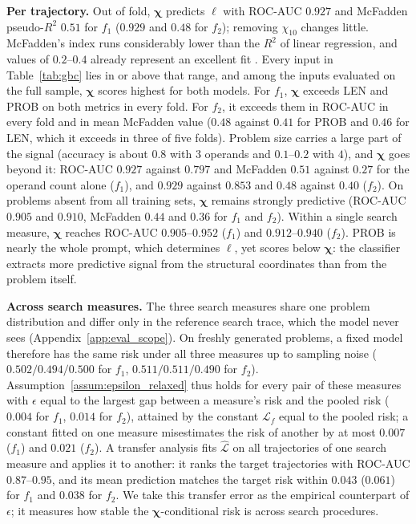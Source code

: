 \textbf{Per trajectory.} Out of fold, $\boldsymbol{\chi}$ predicts $\ell$ with ROC-AUC $0.927$ and McFadden pseudo-$R^2$ $0.51$ for $f_1$ ($0.929$ and $0.48$ for $f_2$); removing $\chi_{10}$ changes little. McFadden's index runs considerably lower than the $R^2$ of linear regression, and values of $0.2$--$0.4$ already represent an excellent fit \citep{mcfadden1979quantitative}. Every input in Table~\ref{tab:gbc} lies in or above that range, and among the inputs evaluated on the full sample, $\boldsymbol{\chi}$ scores highest for both models. For $f_1$, $\boldsymbol{\chi}$ exceeds LEN and PROB on both metrics in every fold. For $f_2$, it exceeds them in ROC-AUC in every fold and in mean McFadden value ($0.48$ against $0.41$ for PROB and $0.46$ for LEN, which it exceeds in three of five folds). Problem size carries a large part of the signal (accuracy is about $0.8$ with $3$ operands and $0.1$--$0.2$ with $4$), and $\boldsymbol{\chi}$ goes beyond it: ROC-AUC $0.927$ against $0.797$ and McFadden $0.51$ against $0.27$ for the operand count alone ($f_1$), and $0.929$ against $0.853$ and $0.48$ against $0.40$ ($f_2$). On problems absent from all training sets, $\boldsymbol{\chi}$ remains strongly predictive (ROC-AUC $0.905$ and $0.910$, McFadden $0.44$ and $0.36$ for $f_1$ and $f_2$). Within a single search measure, $\boldsymbol{\chi}$ reaches ROC-AUC $0.905$--$0.952$ ($f_1$) and $0.912$--$0.940$ ($f_2$). PROB is nearly the whole prompt, which determines $\ell$, yet scores below $\boldsymbol{\chi}$: the classifier extracts more predictive signal from the structural coordinates than from the problem itself.

\textbf{Across search measures.} The three search measures share one problem distribution and differ only in the reference search trace, which the model never sees (Appendix~\ref{app:eval_scope}). On freshly generated problems, a fixed model therefore has the same risk under all three measures up to sampling noise ($0.502/0.494/0.500$ for $f_1$, $0.511/0.511/0.490$ for $f_2$). Assumption~\ref{assum:epsilon_relaxed} thus holds for every pair of these measures with $\epsilon$ equal to the largest gap between a measure's risk and the pooled risk ($0.004$ for $f_1$, $0.014$ for $f_2$), attained by the constant $\mathcal{L}_f$ equal to the pooled risk; a constant fitted on one measure misestimates the risk of another by at most $0.007$ ($f_1$) and $0.021$ ($f_2$). A transfer analysis fits $\hat{\mathcal{L}}$ on all trajectories of one search measure and applies it to another: it ranks the target trajectories with ROC-AUC $0.87$--$0.95$, and its mean prediction matches the target risk within $0.043$ ($0.061$) for $f_1$ and $0.038$ for $f_2$. We take this transfer error as the empirical counterpart of $\epsilon$; it measures how stable the $\boldsymbol{\chi}$-conditional risk is across search procedures.

